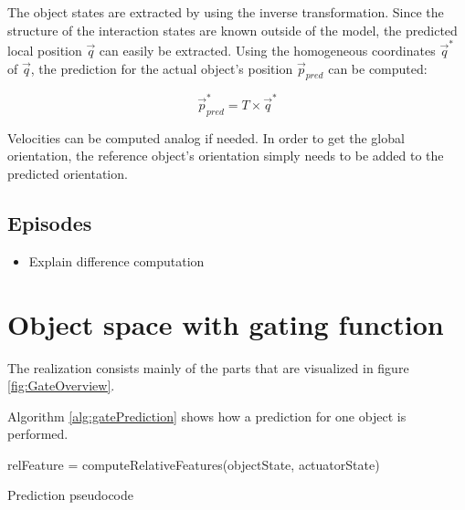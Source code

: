 The object states are extracted by using the inverse transformation. Since the structure of the interaction states are known outside of the model, the predicted local position $\vec{q}$ can easily be extracted. Using the homogeneous coordinates $\vec{q}^*$ of $\vec{q}$, the prediction for the actual object's position $\vec{p}_{pred}$ can be computed:

\begin{equation}
\vec{p}_{pred}^* = T \times \vec{q}^*
\end{equation}

Velocities can be computed analog if needed.
In order to get the global orientation, the reference object's orientation simply needs to be added to the predicted orientation. 

\subsection{Episodes \label{sec:episodes}}

\begin{itemize}
\item Explain difference computation
\end{itemize}










\section{Object space with gating function \label{sec:gateRealization}}

The realization consists mainly of the parts that are visualized in figure \ref{fig:GateOverview}. 

Algorithm \ref{alg:gatePrediction} shows how a prediction for one object is performed. 


\begin{algorithm}
	\BlankLine
	relFeature = computeRelativeFeatures(objectState, actuatorState)\\
	\caption{Prediction pseudocode}
	\label{alg:gatePrediction}
\end{algorithm}

